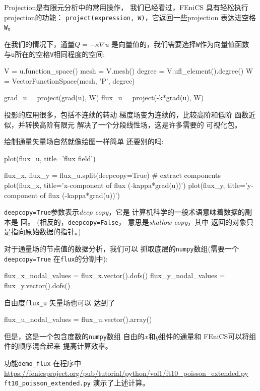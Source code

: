 
Projection是有限元分析中的常用操作，
我们已经看过，FEniCS
具有轻松执行projection的功能：
\texttt{project(expression, W)}，它返回一些projection
表达进空格\texttt{W}。

在我们的情况下，通量$Q=-\kappa\nabla u$
是向量值的，我们需要选择\texttt{W}作为向量值函数
与\texttt{u}所在的空格\texttt{V}相同程度的空间:

\begin{python}
V = u.function_space()
mesh = V.mesh()
degree = V.ufl_element().degree()
W = VectorFunctionSpace(mesh, 'P', degree)

grad_u = project(grad(u), W)
flux_u = project(-k*grad(u), W)
\end{python}

投影的应用很多，包括不连续的转动
梯度场变为连续的，比较高阶和低阶
函数近似，并转换高阶有限元
解决了一个分段线性场，这是许多需要的
可视化包。

绘制通量矢量场自然就像绘图一样简单
还要别的吗:

\begin{python}
plot(flux_u, title='flux field')

flux_x, flux_y = flux_u.split(deepcopy=True)  # extract components
plot(flux_x, title='x-component of flux (-kappa*grad(u))')
plot(flux_y, title='y-component of flux (-kappa*grad(u))')
\end{python}
\texttt{deepcopy=True}参数表示\emph{deep copy}，它是
计算机科学的一般术语意味着数据的副本是
回。 (相反的，\texttt{deepcopy=False}，
意思是\emph{shallow copy}，其中
返回的对象只是指向原始数据的指针。)


对于通量场的节点值的数据分析，我们可以
抓取底层的\texttt{numpy}数组(需要一个\texttt{deepcopy=True}
在\texttt{flux}的分割中):

\begin{python}
flux_x_nodal_values = flux_x.vector().dofs()
flux_y_nodal_values = flux_y.vector().dofs()
\end{python}
自由度\verb!flux_u! 矢量场也可以
达到了

\begin{python}
flux_u_nodal_values = flux_u.vector().array()
\end{python}
但是，这是一个包含度数的\texttt{numpy}数组
自由的$x$和$y$组件的通量和
FEniCS可以将组件的顺序混合起来
提高计算效率。

功能\verb!demo_flux! 在程序中
\url{https://fenicsproject.org/pub/tutorial/python/vol1/ft10_poisson_extended.py} {\nolinkurl{ft10_poisson_extended.py}}
演示了上述计算。

